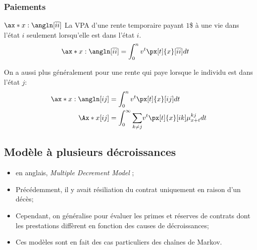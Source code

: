 \documentclass[10pt, french]{article}
\begin{document}
\begin{multicols*}{2}
\subsubsection*{Paiements}
\begin{description}
	\item	$\ax*{x:\angln}[\overline{ii}]$	La VPA d'une rente temporaire payant $1$\$ à une vie dans l'état $i$ seulement lorsqu'elle est dans l'état $i$.
		\begin{align*}
		\ax*{x:\angln}[\overline{ii}]
		&=	\int_{0}^{n} v^{t} \px[t]{x}[\overline{ii}] dt
		\end{align*}
	\item	On a aussi plus généralement pour une rente qui paye lorsque le individu est dans l'état $j$:
\begin{align*}
	\ax*{x:\angln}[ij]
	&=	\int_{0}^{n} v^{t} \px[t]{x}[ij] dt	\\
	\Ax*{x}[ij]
	&=	\int_{0}^{\infty} \sumz{}{k \neq j}	v^{t} \px[t]{x}[ik] \mu_{x + t}^{kj} dt
\end{align*}
\end{description}




\subsection{Modèle à plusieurs décroissances}
\begin{itemize}[leftmargin = *]
	\item	en anglais, \og \textit{Multiple Decrement Model} \fg{};
	\item	Précédemment, il y avait résiliation du contrat uniquement en raison d'un décès;
	\item	Cependant, on généralise pour évaluer les primes et réserves de contrats dont les prestations diffèrent en fonction des causes de décroissances;
	\item	Ces modèles sont en fait des cas particuliers des chaînes de Markov.
\end{itemize}


\end{multicols*}
\end{document}
